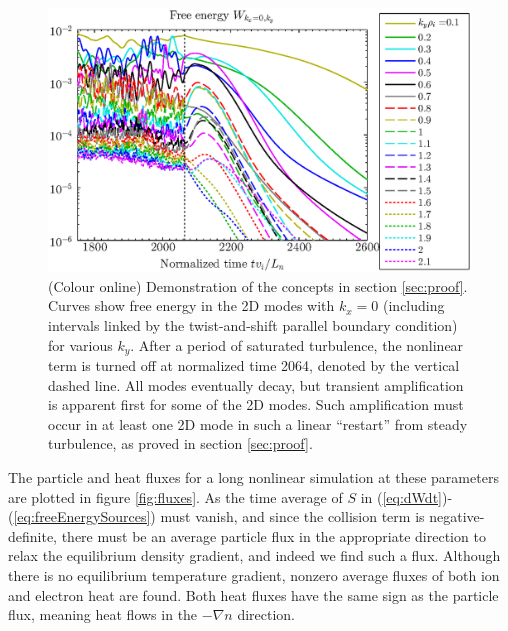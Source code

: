 \documentclass{jpp}
\begin{document}
\begin{figure}
\centerline{\includegraphics[width=6.5in]{fig8.eps}}
\caption{(Colour online)
Demonstration of the concepts in section \ref{sec:proof}.
Curves show free energy in the 2D modes with $k_x=0$ (including intervals linked by
the twist-and-shift parallel boundary condition) for various $k_y$.
After a period of saturated turbulence, the nonlinear term is turned off at normalized
time 2064, denoted by the vertical dashed line.
All modes eventually decay, but transient amplification is apparent first
for some of the 2D modes. Such amplification must occur in at least one 2D mode in such a linear ``restart'' from
steady turbulence, as proved in section \ref{sec:proof}.
\label{fig:linearRestart}}
\end{figure}

The particle and heat fluxes for a long nonlinear simulation at these parameters are plotted in figure \ref{fig:fluxes}.
As the time average of $S$ in (\ref{eq:dWdt})-(\ref{eq:freeEnergySources}) must vanish, and since the collision term
is negative-definite, there must be an average particle flux in the appropriate direction
to relax the equilibrium density gradient, and indeed we find such a flux.
Although there is no equilibrium temperature gradient, nonzero average fluxes
of both ion and electron heat are found.  Both heat fluxes have the same sign
as the particle flux, meaning heat flows in the $-\nabla n$ direction.
\end{document}
